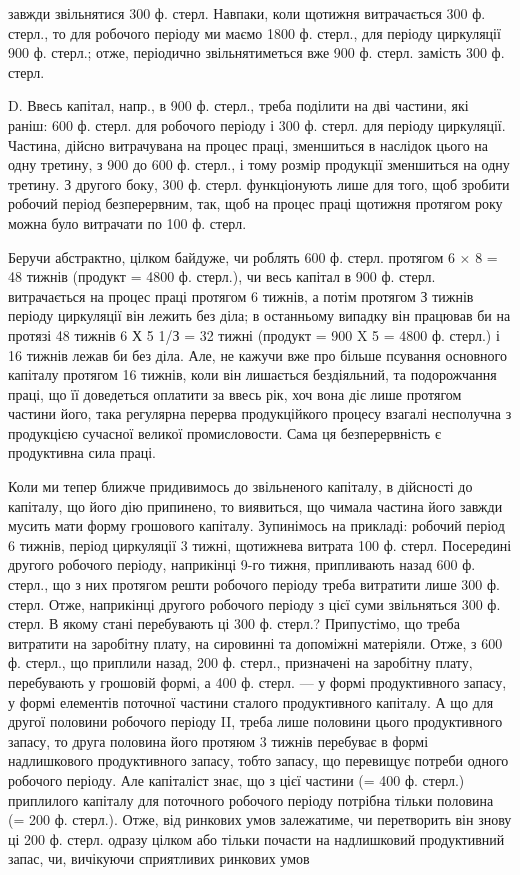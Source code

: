 \parcont{}  %
завжди звільнятися 300 ф. стерл. Навпаки, коли щотижня витрачається
300 ф. стерл., то для робочого періоду ми маємо 1800 ф. стерл., для періоду
циркуляції 900 ф. стерл.; отже, періодично звільнятиметься вже 900 ф. стерл.
замість 300 ф. стерл.

D. Ввесь капітал, напр., в 900 ф. стерл., треба поділити на дві частини,
які раніш: 600 ф. стерл. для робочого періоду і 300 ф. стерл. для періоду
циркуляції. Частина, дійсно витрачувана на процес праці, зменшиться в
наслідок цього на одну третину, з 900 до 600 ф. стерл., і тому розмір продукції
зменшиться на одну третину. З другого боку, 300 ф. стерл.
функціонують лише для того, щоб зробити робочий період безперервним,
так, щоб на процес праці щотижня протягом року можна було витрачати
по 100 ф. стерл.

Беручи абстрактно, цілком байдуже, чи роблять 600 ф. стерл. протягом
6 × 8 = 48 тижнів (продукт = 4800 ф. стерл.), чи весь капітал в 900 ф. стерл.
витрачається на процес праці протягом 6 тижнів, а потім протягом
З тижнів періоду циркуляції він лежить без діла; в останньому випадку
він працював би на протязі 48 тижнів 6 Х 5 1/З = 32 тижні (продукт =
900 X 5 = 4800 ф. стерл.) і 16 тижнів лежав би без діла. Але, не кажучи
вже про більше псування основного капіталу протягом 16 тижнів, коли
він лишається бездіяльний, та подорожчання праці, що її доведеться оплатити
за ввесь рік, хоч вона діє лише протягом частини його, така регулярна
перерва продукційкого процесу взагалі несполучна з продукцією
сучасної великої промисловости. Сама ця безперервність є продуктивна
сила праці.

Коли ми тепер ближче придивимось до звільненого капіталу, в дійсності
до капіталу, що його дію припинено, то виявиться, що чимала
частина його завжди мусить мати форму грошового капіталу. Зупинімось
на прикладі: робочий період 6 тижнів, період циркуляції 3 тижні, щотижнева
витрата 100 ф. стерл. Посередині другого робочого періоду,
наприкінці 9-го тижня, припливають назад 600 ф. стерл., що з них протягом
решти робочого періоду треба витратити лише 300 ф. стерл.
Отже, наприкінці другого робочого періоду з цієї суми звільняться
300 ф. стерл. В якому стані перебувають ці 300 ф. стерл.? Припустімо,
що  треба витратити на заробітну плату,  на сировинні та допоміжні
матеріяли. Отже, з 600 ф. стерл., що приплили назад, 200 ф. стерл., призначені
на заробітну плату, перебувають у грошовій формі, а 400 ф.
стерл. — у формі продуктивного запасу, у формі елементів поточної
частини сталого продуктивного капіталу. А що для другої половини
робочого періоду II, треба лише половини цього продуктивного запасу,
то друга половина його протяюм 3 тижнів перебуває в формі надлишкового
продуктивного запасу, тобто запасу, що перевищує потреби одного
робочого періоду. Але капіталіст знає, що з цієї частини (= 400 ф. стерл.)
приплилого капіталу для поточного робочого періоду потрібна тільки
половина (= 200 ф. стерл.). Отже, від ринкових умов залежатиме, чи
перетворить він знову ці 200 ф. стерл. одразу цілком або тільки почасти на
надлишковий продуктивний запас, чи, вичікуючи сприятливих ринкових умов
\parbreak{}  %
